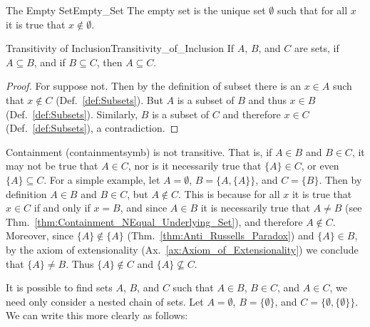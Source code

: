        \begin{fdefinition}{The Empty Set}{Empty_Set}
            The \gls{empty set} is the unique \gls{set} $\emptyset$ such that
            for all $x$ it is true that $x\notin\emptyset$.
        \end{fdefinition}
        \begin{ltheorem}{Transitivity of Inclusion}{Transitivity_of_Inclusion}
            If $A$, $B$, and $C$ are sets, if $A\subseteq{B}$, and if
            $B\subseteq{C}$, then $A\subseteq{C}$.
        \end{ltheorem}
        \begin{proof}
            For suppose not. Then by the definition of subset there is an
            $x\in{A}$ such that $x\notin{C}$ (Def.~\ref{def:Subsets}). But $A$
            is a subset of $B$ and thus $x\in{B}$ (Def.~\ref{def:Subsets}).
            Similarly, $B$ is a subset of $C$ and therefore $x\in{C}$
            (Def.~\ref{def:Subsets}), a contradiction.
        \end{proof}
        Containment (\gls{containmentsymb}) is not transitive. That is, if
        $A\in{B}$ and $B\in{C}$, it may not be true that $A\in{C}$, nor is it
        necessarily true that $\{A\}\in{C}$, or even $\{A\}\subseteq{C}$. For a
        simple example, let $A=\emptyset$, $B=\{A,\{A\}\}$, and
        $C=\{B\}$. Then by definition $A\in{B}$ and $B\in{C}$, but $A\notin{C}$.
        This is because for all $x$ it is true that $x\in{C}$ if and only if
        $x=B$, and since $A\in{B}$ it is necessarily true that $A\ne{B}$
        (see Thm.~\ref{thm:Containment_NEqual_Underlying_Set}), and therefore
        $A\notin{C}$. Moreover, since $\{A\}\notin\{A\}$
        (Thm.~\ref{thm:Anti_Russells_Paradox}) and $\{A\}\in{B}$, by the axiom
        of extensionality (Ax.~\ref{ax:Axiom_of_Extensionality}) we conclude
        that $\{A\}\ne{B}$. Thus $\{A\}\notin{C}$ and $\{A\}\nsubseteq{C}$.
        \par\hfill\par
        It is possible to find sets $A$, $B$, and $C$ such that $A\in{B}$,
        $B\in{C}$, and $A\in{C}$, we need only consider a nested chain of sets.
        Let $A=\emptyset$, $B=\{\emptyset\}$, and
        $C=\{\emptyset,\{\emptyset\}\}$. We can write this more clearly as
        follows:
        \par
